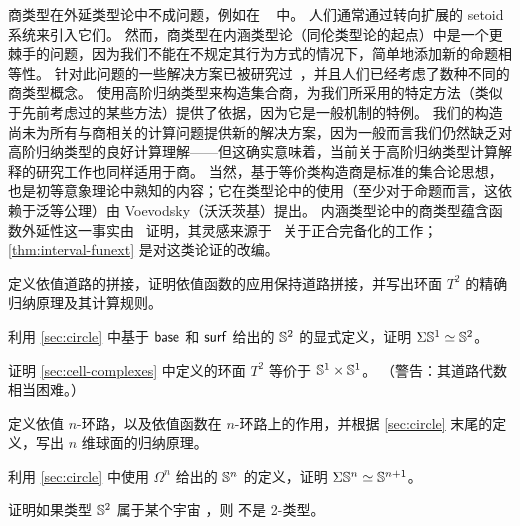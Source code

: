 商类型在外延类型论中不成问题，例如在 \NuPRL~\cite{constable+86nuprl-book} 中。
人们通常通过转向扩展的 setoid 系统来引入它们。
然而，商类型在内涵类型论（同伦类型论的起点）中是一个更棘手的问题，因为我们不能在不规定其行为方式的情况下，简单地添加新的命题相等性。
针对此问题的一些解决方案已被研究过~\cite{hofmann:thesis,Altenkirch1999,altenkirch+07ott}，并且人们已经考虑了数种不同的商类型概念。
使用高阶归纳类型来构造集合商，为我们所采用的特定方法（类似于先前考虑过的某些方法）提供了依据，因为它是一般机制的特例。
我们的构造尚未为所有与商相关的计算问题提供新的解决方案，因为一般而言我们仍然缺乏对高阶归纳类型的良好计算理解——但这确实意味着，当前关于高阶归纳类型计算解释的研究工作也同样适用于商。
当然，基于等价类构造商是标准的集合论思想，也是初等意象理论中熟知的内容；它在类型论中的使用（至少对于命题而言，这依赖于泛等公理）由 Voevodsky（沃沃茨基）提出。
内涵类型论中的商类型蕴含函数外延性这一事实由~\cite{hofmann:thesis} 证明，其灵感来源于~\cite{carboni} 关于正合完备化的工作；\cref{thm:interval-funext} 是对这类论证的改编。

\sectionExercises

\begin{ex}\label{ex:torus}
  定义依值道路的拼接，证明依值函数的应用保持道路拼接，并写出环面 $T^2$ 的精确归纳原理及其计算规则。
\end{ex}

\begin{ex}\label{ex:suspS1}
  利用 \cref{sec:circle} 中基于 $\mathsf{base}$ 和 $\mathsf{surf}$ 给出的 $\mathbb{S}^2$ 的显式定义，证明 $\Sigma \mathbb{S}^1 \simeq \mathbb{S}^2$。
\end{ex}

\begin{ex}\label{ex:torus-s1-times-s1}
  证明 \cref{sec:cell-complexes} 中定义的环面 $T^2$ 等价于 $\mathbb{S}^1\times \mathbb{S}^1$。
  （警告：其道路代数相当困难。）
\end{ex}

\begin{ex}\label{ex:nspheres}
  定义依值 $n$-环路，以及依值函数在 $n$-环路上的作用，并根据 \cref{sec:circle} 末尾的定义，写出 $n$ 维球面的归纳原理。
\end{ex}

\begin{ex}\label{ex:susp-spheres-equiv}
  利用 \cref{sec:circle} 中使用 $\Omega^n$ 给出的 $\mathbb{S}^n$ 的定义，证明 $\Sigma \mathbb{S}^n \simeq \mathbb{S}^{n+1}$。
\end{ex}

\begin{ex}\label{ex:spheres-make-U-not-2-type}
  证明如果类型 $\mathbb{S}^2$ 属于某个宇宙 \type，则 \type 不是 2-类型。
\end{ex}

